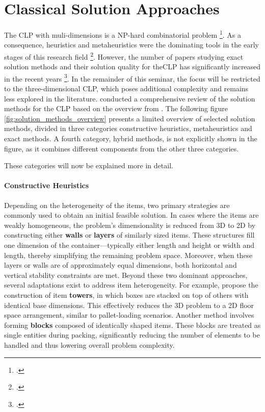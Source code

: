 \chapter{Classical Solution Approaches}
\label{sec:classical_solution_approaches}
The \gls{CLP} with muli-dimensions is a NP-hard combinatorial problem \footcite[cf.][p.11]{bortfeldt_constraints_2013}.
As a consequence, heuristics and metaheuristics were the dominating tools
in the early stages of this research field  \footcite[cf.][]{pisinger_heuristics_2002}.
However, the number of papers studying exact solution methods and their solution quality
for the\gls{CLP} has significantly increased in the recent years \footcite[cf.][p.23]{iori_exact_2021}.
In the remainder of this seminar, the focus will be restricted to the three-dimensional \gls{CLP},
which poses additional complexity and remains less explored in the literature.
\citeauthor{zhao_comparative_2016} conducted a comprehensive review of the solution methods
for the \gls{CLP} based on the overview from \citeauthor{bortfeldt_constraints_2013}.
The following figure \ref{fig:solution_methods_overview} presents a limited overview of
selected solution methods, divided in three categories constructive heuristics, metaheuristics
and exact methods. A fourth category, hybrid methods, is not explicitly shown in the figure, as it combines different
components from the other three categories.



These categories will now be explained more in detail.

\subsubsection{Constructive Heuristics}
Depending on the heterogeneity of the items, two primary strategies are commonly used to
obtain an initial feasible solution. In cases where the items are weakly homogeneous,
the problem's dimensionality is reduced from 3D to 2D by constructing either
\textbf{walls} or \textbf{layers} of similarly sized items. These structures fill one
dimension of the container—typically either length and height or width and length, thereby
simplifying the remaining problem space. Moreover, when these layers or walls are of
approximately equal dimensions, both horizontal and vertical stability constraints are met.
Beyond these two dominant approaches, several adaptations exist to address item heterogeneity.
For example, \citeauthor{gehring_genetic_1997} propose the construction of item
\textbf{towers}, in which boxes are stacked on top of others with identical base dimensions.
This effectively reduces the 3D problem to a 2D floor space arrangement,
similar to pallet-loading scenarios. Another method involves forming \textbf{blocks}
composed of identically shaped items. These blocks are treated as single entities
during packing, significantly reducing the number of elements to be handled and thus
lowering overall problem complexity.

